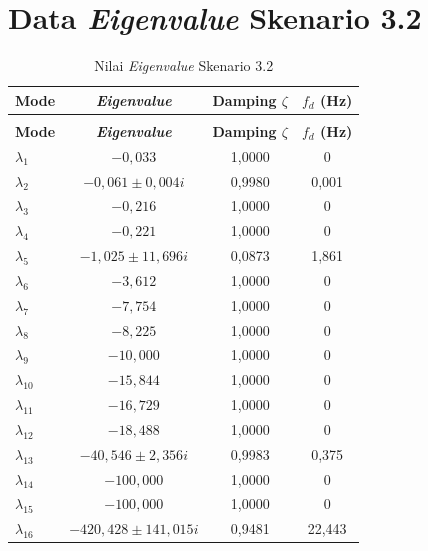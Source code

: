 \section{Data \textit{Eigenvalue} Skenario 3.2}
\begingroup
\fontsize{11}{13.2}\selectfont
\setlength{\tabcolsep}{7pt}
\begin{longtable}{>{\centering\arraybackslash}m{1.5cm} c c c} \caption[]{Nilai
	\textit{Eigenvalue} Skenario 3.2} \label{tab:eigenvalue_sk32_lampiran} \\
	\toprule
	\textbf{Mode} & \textbf{\textit{Eigenvalue}} & \textbf{Damping $\zeta$} &
	\textbf{$f_d$ (Hz)} \\
	\midrule
	\endfirsthead
	\multicolumn{4}{l}{\textit{(lanjutan)}} \\
	\toprule
	\textbf{Mode} & \textbf{\textit{Eigenvalue}} & \textbf{Damping $\zeta$} &
	\textbf{$f_d$ (Hz)} \\
	\midrule
	\endhead
	\bottomrule
	\endfoot
	$\lambda_1$  & $-0{,}033$                      & 1,0000 & 0 \\
	$\lambda_2$  & $-0{,}061 \pm 0{,}004i$         & 0,9980 & 0,001 \\
	$\lambda_3$  & $-0{,}216$                      & 1,0000 & 0 \\
	$\lambda_4$  & $-0{,}221$                      & 1,0000 & 0 \\
	$\lambda_5$  & $-1{,}025 \pm 11{,}696i$        & 0,0873 & 1,861 \\
	$\lambda_6$  & $-3{,}612$                      & 1,0000 & 0 \\
	$\lambda_7$  & $-7{,}754$                      & 1,0000 & 0 \\
	$\lambda_8$  & $-8{,}225$                      & 1,0000 & 0 \\
	$\lambda_9$  & $-10{,}000$                     & 1,0000 & 0 \\
	$\lambda_{10}$ & $-15{,}844$                   & 1,0000 & 0 \\
	$\lambda_{11}$ & $-16{,}729$                   & 1,0000 & 0 \\
	$\lambda_{12}$ & $-18{,}488$                   & 1,0000 & 0 \\
	$\lambda_{13}$ & $-40{,}546 \pm 2{,}356i$      & 0,9983 & 0,375 \\
	$\lambda_{14}$ & $-100{,}000$                  & 1,0000 & 0 \\
	$\lambda_{15}$ & $-100{,}000$                  & 1,0000 & 0 \\
	$\lambda_{16}$ & $-420{,}428 \pm 141{,}015i$   & 0,9481 & 22,443 \\
\end{longtable}
\par
\endgroup

